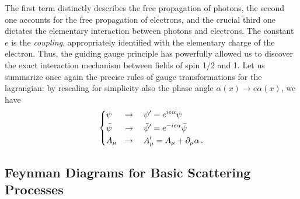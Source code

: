 The first term distinctly describes the free propagation of photons, the second one accounts for the free propagation of electrons, and the crucial third one dictates the elementary interaction between photons and electrons. The constant \(e\) is the \textit{coupling}, appropriately identified with the elementary charge of the electron. Thus, the guiding gauge principle has powerfully allowed us to discover the exact interaction mechanism between fields of spin 1/2 and 1. Let us summarize once again the precise rules of gauge transformations for the lagrangian: by rescaling for simplicity also the phase angle \(\alpha(x) \rightarrow e\alpha(x)\), we have
\begin{equation} \label{eq:rescaled_transformations}
    \begin{dcases}
        \psi       & \rightarrow \quad \psi' = e^{ie\alpha}\psi                 \\
        \bar{\psi} & \rightarrow \quad \bar{\psi}' = e^{-ie\alpha}\bar{\psi}    \\
        A_\mu      & \rightarrow \quad A'_\mu = A_\mu + \partial_\mu\alpha \, .
    \end{dcases}
\end{equation}

\subsection{Feynman Diagrams for Basic Scattering Processes}

